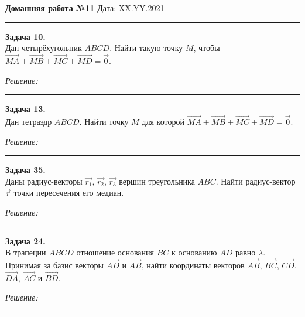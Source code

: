 \documentclass[a4paper, 12pt]{article}
\newenvironment{problem}[2][Задача]
{ \begin{mdframed}[backgroundcolor=gray!10] \textbf{#1 #2.} \\}
	{  \end{mdframed}}
\newenvironment{solution}
{\textit{Решение:}\vspace{.1cm}\\}
{\vspace{.1cm}\noindent\rule{7in}{1.5pt}}
\begin{document}
\noindent
\large\textbf{Домашняя работа №11} \hfill  Дата: XX.YY.2021  \\
\noindent\rule{7in}{2pt}

\begin{problem}{10}
Дан четырёхугольник $ABCD$. Найти такую точку $M$, чтобы 
$\vec{MA}+\vec{MB}+\vec{MC}+\vec{MD}=\vec{0}$.

\end{problem}
\begin{solution}


\end{solution} 

\begin{problem}{13}
Дан тетраэдр $ABCD$. Найти точку $M$ для которой
$\vec{MA}+\vec{MB}+\vec{MC}+\vec{MD}=\vec{0}$.

\end{problem}
\begin{solution}


\end{solution} 

\begin{problem}{35}
Даны радиус-векторы $\vec{r_1}$, $\vec{r_2}$, $\vec{r_3}$ вершин треугольника $ABC$. 
Найти радиус-вектор $\vec r$ точки пересечения его медиан.

\end{problem}
\begin{solution}


\end{solution} 

\begin{problem}{24}
В трапеции $ABCD$ отношение основания $BC$ к основанию $AD$ равно $\lambda$. Принимая за базис
векторы $\vec{AD}$ и $\vec{AB}$, найти координаты векторов 
$\vec{AB}$, $\vec{BC}$, $\vec{CD}$, $\vec{DA}$,
$\vec{AC}$ и $\vec{BD}$.

\end{problem}
\begin{solution}


\end{solution} 
\end{document}
